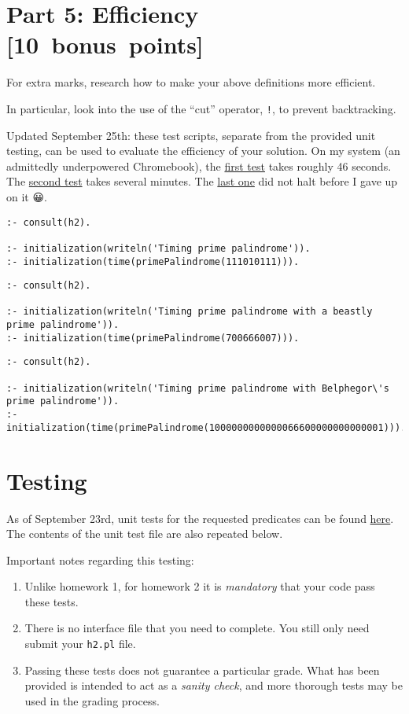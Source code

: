 \documentclass[11pt]{article}
\begin{document}
\section*{Part 5: Efficiency                                     [10 bonus points]}
\label{sec:org891d4ee}
For extra marks, research how to make your above definitions more efficient.

In particular, look into the use of the “cut” operator, \texttt{!},
to prevent backtracking.

Updated September 25th: these test scripts,
separate from the provided unit testing, can be used
to evaluate the efficiency of your solution.
On my system (an admittedly underpowered Chromebook),
the \href{./testing/h2/h2-timing.pl}{first test} takes roughly 46 seconds.
The \href{./testing/h2/h2-beastly-timing.pl}{second test} takes several minutes.
The \href{./testing/h2/h2-belphegor-timing.pl}{last one} did not halt before I gave up on it 😀.
\begin{verbatim}
:- consult(h2).

:- initialization(writeln('Timing prime palindrome')).
:- initialization(time(primePalindrome(111010111))).
\end{verbatim}
\begin{verbatim}
:- consult(h2).

:- initialization(writeln('Timing prime palindrome with a beastly prime palindrome')).
:- initialization(time(primePalindrome(700666007))).
\end{verbatim}
\begin{verbatim}
:- consult(h2).

:- initialization(writeln('Timing prime palindrome with Belphegor\'s prime palindrome')).
:- initialization(time(primePalindrome(1000000000000066600000000000001))).
\end{verbatim}

\section*{Testing}
\label{sec:org8e52d6b}
As of September 23rd, unit tests for the requested predicates
can be found \href{./testing/h2/h2.plt}{here}. The contents of the unit test file are also repeated below.

Important notes regarding this testing:
\begin{enumerate}
\item Unlike homework 1, for homework 2 it is \emph{mandatory}
that your code pass these tests.
\item There is no interface file that you need to complete.
You still only need submit your \texttt{h2.pl} file.
\item Passing these tests does not guarantee a particular grade.
What has been provided is intended to act as a \emph{sanity check},
and more thorough tests may be used in the grading process.
\end{enumerate}
\end{document}
